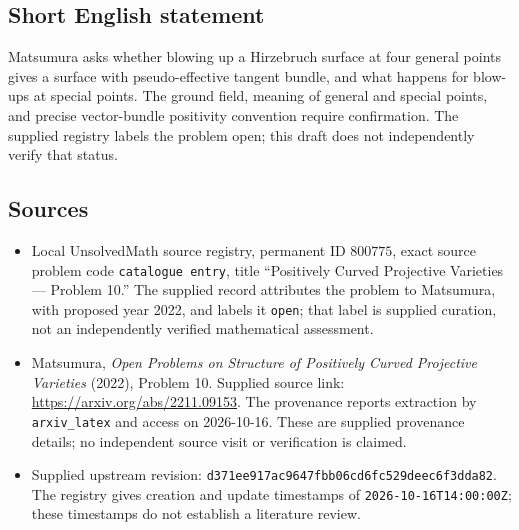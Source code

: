 \documentclass[11pt]{article}
\begin{document}
\subsection{Short English statement}
Matsumura asks whether blowing up a Hirzebruch surface at four general points gives a surface with pseudo-effective tangent bundle, and what happens for blow-ups at special points. The ground field, meaning of general and special points, and precise vector-bundle positivity convention require confirmation. The supplied registry labels the problem open; this draft does not independently verify that status.
\subsection{Sources}
\begin{itemize}
\item Local UnsolvedMath source registry, permanent ID \(800775\), exact source problem code \texttt{catalogue entry}, title ``Positively Curved Projective Varieties --- Problem 10.'' The supplied record attributes the problem to Matsumura, with proposed year 2022, and labels it \texttt{open}; that label is supplied curation, not an independently verified mathematical assessment.
\item Matsumura, \emph{Open Problems on Structure of Positively Curved Projective Varieties} (2022), Problem 10. Supplied source link: \url{https://arxiv.org/abs/2211.09153}. The provenance reports extraction by \texttt{arxiv\_latex} and access on 2026-10-16. These are supplied provenance details; no independent source visit or verification is claimed.
\item Supplied upstream revision: \texttt{d371ee917ac9647fbb06cd6fc529deec6f3dda82}. The registry gives creation and update timestamps of \texttt{2026-10-16T14:00:00Z}; these timestamps do not establish a literature review.
\end{itemize}
\end{document}
